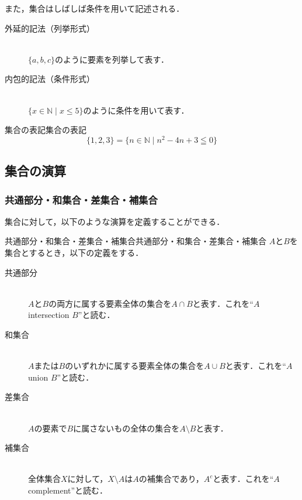 また，集合はしばしば条件を用いて記述される．

\begin{description}
  \item[外延的記法（列挙形式）] \mbox{} \\
        $\{ a, b, c \}$のように要素を列挙して表す．
  \item[内包的記法（条件形式）] \mbox{} \\
        $\{ x \in \mathbb{N} \mid x \leq 5 \}$のように条件を用いて表す．
\end{description}


\begin{example}{集合の表記}{集合の表記}
  \[
    \{ 1,2,3 \} = \{ n \in \mathbb{N} \mid  n^2 -4n +3 \leqq 0 \}
  \]
\end{example}

\subsection{集合の演算}

\subsubsection{共通部分・和集合・差集合・補集合}
集合に対して，以下のような演算を定義することができる．

\begin{definition}{共通部分・和集合・差集合・補集合}{共通部分・和集合・差集合・補集合}
  $A$と$B$を集合とするとき，以下の定義をする．
  \begin{description}
    \item[共通部分] \mbox{}\\
          $A$と$B$の両方に属する要素全体の集合を$A \cap B$と表す．これを``$A$ intersection $B$''と読む．
    \item[和集合] \mbox{} \\
          $A$または$B$のいずれかに属する要素全体の集合を$A \cup B$と表す．これを``$A$ union $B$''と読む．
    \item[差集合]\mbox{}\\
          $A$の要素で$B$に属さないもの全体の集合を$A \setminus B$と表す．
    \item[補集合] \mbox{}\\
          全体集合$X$に対して，$X \setminus A$は$A$の補集合であり，$A^c$と表す．これを``$A$ complement''と読む．
  \end{description}
\end{definition}


